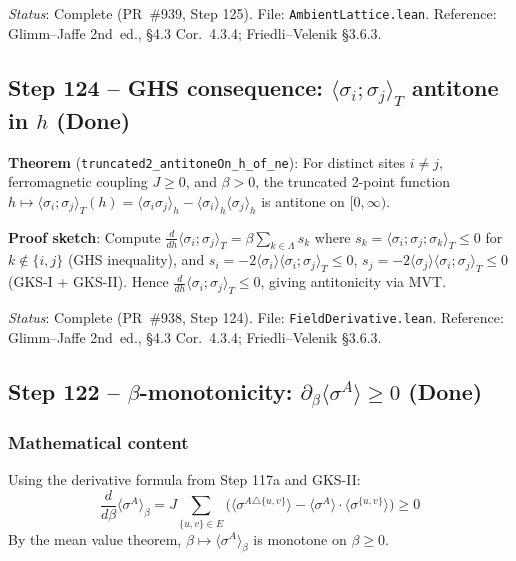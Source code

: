 \documentclass[a4paper,11pt]{article}
\begin{document}
\noindent\textit{Status}: Complete (PR~\#939, Step 125).
File: \texttt{AmbientLattice.lean}.
Reference: Glimm--Jaffe 2nd~ed., \S4.3 Cor.~4.3.4; Friedli--Velenik \S3.6.3.

\subsection*{Step 124 -- GHS consequence: $\langle\sigma_i;\sigma_j\rangle_T$ antitone in $h$ (Done)}

\noindent\textbf{Theorem} (\texttt{truncated2\_antitoneOn\_h\_of\_ne}):
For distinct sites $i \neq j$, ferromagnetic coupling $J \geq 0$, and $\beta > 0$,
the truncated 2-point function
$h \mapsto \langle\sigma_i;\sigma_j\rangle_T(h) = \langle\sigma_i\sigma_j\rangle_h - \langle\sigma_i\rangle_h\langle\sigma_j\rangle_h$
is antitone on $[0,\infty)$.

\noindent\textbf{Proof sketch}: Compute $\tfrac{d}{dh}\langle\sigma_i;\sigma_j\rangle_T = \beta\sum_{k\in\Lambda} s_k$
where $s_k = \langle\sigma_i;\sigma_j;\sigma_k\rangle_T \leq 0$ for $k \notin \{i,j\}$ (GHS inequality),
and $s_i = -2\langle\sigma_i\rangle\langle\sigma_i;\sigma_j\rangle_T \leq 0$,
$s_j = -2\langle\sigma_j\rangle\langle\sigma_i;\sigma_j\rangle_T \leq 0$ (GKS-I + GKS-II).
Hence $\tfrac{d}{dh}\langle\sigma_i;\sigma_j\rangle_T \leq 0$, giving antitonicity via MVT.

\noindent\textit{Status}: Complete (PR~\#938, Step 124).
File: \texttt{FieldDerivative.lean}.
Reference: Glimm--Jaffe 2nd~ed., \S4.3 Cor.~4.3.4; Friedli--Velenik \S3.6.3.

\subsection*{Step 122 -- $\beta$-monotonicity: $\partial_\beta \langle \sigma^A \rangle \geq 0$ (Done)}

\subsubsection*{Mathematical content}

Using the derivative formula from Step 117a and GKS-II:
\[
  \frac{d}{d\beta} \langle \sigma^A \rangle_\beta
  = J \sum_{\{u,v\} \in E} \bigl(
    \langle \sigma^{A \triangle \{u,v\}} \rangle - \langle \sigma^A \rangle \cdot \langle \sigma^{\{u,v\}} \rangle
  \bigr) \geq 0
\]
By the mean value theorem, $\beta \mapsto \langle \sigma^A \rangle_\beta$ is monotone on $\beta \geq 0$.
\end{document}
